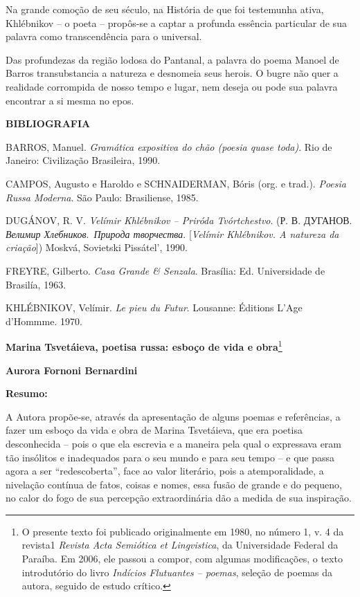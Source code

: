 Na grande comoção de seu século, na História de que foi testemunha
ativa, Khlébnikov -- o poeta -- propôs-se a captar a profunda essência
particular de sua palavra como transcendência para o universal.

Das profundezas da região lodosa do Pantanal, a palavra do poema Manoel
de Barros transubstancia a natureza e desnomeia seus herois. O bugre não
quer a realidade corrompida de nosso tempo e lugar, nem deseja ou pode
sua palavra encontrar a si mesma no epos.

\textbf{BIBLIOGRAFIA}

BARROS, Manuel. \emph{Gramática expositiva do chão (poesia quase toda)}.
Rio de Janeiro: Civilização Brasileira, 1990.

CAMPOS, Augusto e Haroldo e SCHNAIDERMAN, Bóris (org. e trad.).
\emph{Poesia Russa Moderna}. São Paulo: Brasiliense, 1985.

DUGÁNOV, R. V. \emph{Velímir Khlébnikov -- Priróda Tvórtchestvo}. (Р. В.
ДУГАНОВ. \emph{Велимир Хлебников}.~\emph{Природа творчества}.
{[}\emph{Velímir Khlébnikov. A natureza da criação}{]}) Moskvá,
Sovietski Pissátel', 1990.

FREYRE, Gilberto. \emph{Casa Grande \& Senzala}. Brasília: Ed.
Universidade de Brasilía, 1963.

KHLÉBNIKOV, Velímir. \emph{Le pieu du Futur}. Lousanne: Éditions L'Age
d'Hommme. 1970.

\textbf{Marina Tsvetáieva, poetisa russa: esboço de vida e
obra}\footnote{O presente texto foi publicado originalmente em 1980, no
  número 1, v. 4 da revista1 \emph{Revista Acta Semiótica et
  Lingvistica}, da Universidade Federal da Paraíba. Em 2006, ele passou
  a compor, com algumas modificações, o texto introdutório do livro
  \emph{Indícios Flutuantes -- poemas}, seleção de poemas da autora,
  seguido de estudo crítico.}

\textbf{Aurora Fornoni Bernardini}

\textbf{Resumo: }

A Autora propõe-se, através da apresentação de alguns poemas e
referências, a fazer um esboço da vida e obra de Marina Tsvetáieva, que
era poetisa desconhecida -- pois o que ela escrevia e a maneira pela
qual o expressava eram tão insólitos e inadequados para o seu mundo e
para seu tempo -- e que passa agora a ser ``redescoberta'', face ao
valor literário, pois a atemporalidade, a nivelação contínua de fatos,
coisas e nomes, essa fusão de grande e do pequeno, no calor do fogo de
sua percepção extraordinária dão a medida de sua inspiração.

